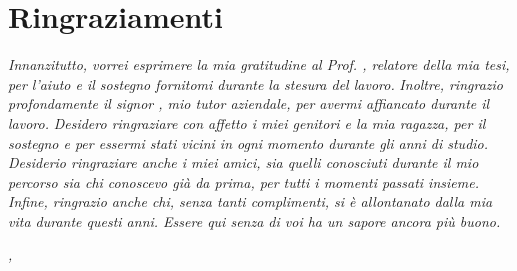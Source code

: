 \cleardoublepage
{}
{}


\bigskip

\begingroup
\let\clearpage\relax
\let\cleardoublepage\relax
\let\cleardoublepage\relax

\chapter*{Ringraziamenti}

\textit{Innanzitutto, vorrei esprimere la mia gratitudine al Prof. \myProf, relatore della mia tesi, per l'aiuto e il sostegno fornitomi durante la stesura del lavoro.}
\textit{Inoltre, ringrazio profondamente il signor \myTutor, mio tutor aziendale, per avermi affiancato durante il lavoro.}
\textit{Desidero ringraziare con affetto i miei genitori e la mia ragazza, per il sostegno e per essermi stati vicini in ogni momento durante gli anni di studio.}
\textit{Desiderio ringraziare anche i miei amici, sia quelli conosciuti durante il mio percorso sia chi conoscevo già da prima, per tutti i momenti passati insieme.}
\textit{Infine, ringrazio anche chi, senza tanti complimenti, si è allontanato dalla mia vita durante questi anni. Essere qui senza di voi ha un sapore ancora più buono.}
\bigskip

\noindent\textit{\myLocation, \myTime}
\hfill \myName

\endgroup
